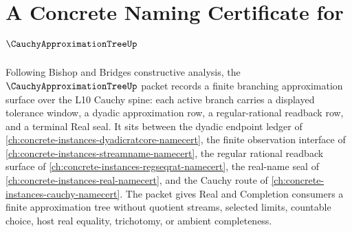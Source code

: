 \chapter{A Concrete Naming Certificate for $\CauchyApproximationTreeUp$}
\label{ch:concrete-instances-cauchy-approximation-tree-namecert}

Following Bishop and Bridges constructive analysis, the $\CauchyApproximationTreeUp$ packet records a finite branching approximation surface over the L10 Cauchy spine: each active branch carries a displayed tolerance window, a dyadic approximation row, a regular-rational readback row, and a terminal Real seal. It sits between the dyadic endpoint ledger of \autoref{ch:concrete-instances-dyadicratcore-namecert}, the finite observation interface of \autoref{ch:concrete-instances-streamname-namecert}, the regular rational readback surface of \autoref{ch:concrete-instances-regseqrat-namecert}, the real-name seal of \autoref{ch:concrete-instances-real-namecert}, and the Cauchy route of \autoref{ch:concrete-instances-cauchy-namecert}. The packet gives Real and Completion consumers a finite approximation tree without quotient streams, selected limits, countable choice, host real equality, trichotomy, or ambient completeness.

